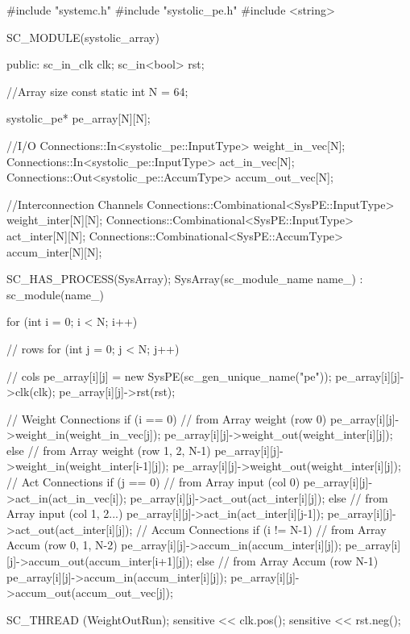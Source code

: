 \begin{codeblock}[language=c++]

#include "systemc.h"
#include "systolic_pe.h"
#include <string>

SC_MODULE(systolic_array){
  public:
    sc_in_clk   clk;
    sc_in<bool> rst;

  //Array size
  const static int N = 64;

  systolic_pe* pe_array[N][N];

  //I/O
  Connections::In<systolic_pe::InputType>   weight_in_vec[N];
  Connections::In<systolic_pe::InputType>   act_in_vec[N];
  Connections::Out<systolic_pe::AccumType>  accum_out_vec[N];

  //Interconnection Channels
  Connections::Combinational<SysPE::InputType> weight_inter[N][N];
  Connections::Combinational<SysPE::InputType> act_inter[N][N]; 
  Connections::Combinational<SysPE::AccumType> accum_inter[N][N];

  SC_HAS_PROCESS(SysArray);
  SysArray(sc_module_name name_) : sc_module(name_) {
    for (int i = 0; i < N; i++) {    // rows
      for (int j = 0; j < N; j++) {  // cols
        pe_array[i][j] = new SysPE(sc_gen_unique_name("pe"));
        pe_array[i][j]->clk(clk);
        pe_array[i][j]->rst(rst);
        
        // Weight Connections
        if (i == 0) {    // from Array weight (row 0)
          pe_array[i][j]->weight_in(weight_in_vec[j]);
          pe_array[i][j]->weight_out(weight_inter[i][j]);
        }
        else {           // from Array weight (row 1, 2, N-1)
          pe_array[i][j]->weight_in(weight_inter[i-1][j]);
          pe_array[i][j]->weight_out(weight_inter[i][j]);
        }
        // Act Connections
        if (j == 0) {  // from Array input (col 0)
          pe_array[i][j]->act_in(act_in_vec[i]);
          pe_array[i][j]->act_out(act_inter[i][j]);
        }
        else {         // from Array input (col 1, 2...)
          pe_array[i][j]->act_in(act_inter[i][j-1]);
          pe_array[i][j]->act_out(act_inter[i][j]);
        }
        // Accum Connections
        if (i != N-1) {  // from Array Accum (row 0, 1, N-2)
          pe_array[i][j]->accum_in(accum_inter[i][j]);
          pe_array[i][j]->accum_out(accum_inter[i+1][j]);
        }
        else {           // from Array Accum (row N-1)
          pe_array[i][j]->accum_in(accum_inter[i][j]);
          pe_array[i][j]->accum_out(accum_out_vec[j]);
        }
      }  
    }
 
    SC_THREAD (WeightOutRun);
    sensitive << clk.pos();
    sensitive << rst.neg();
    
}}
\end{codeblock}
